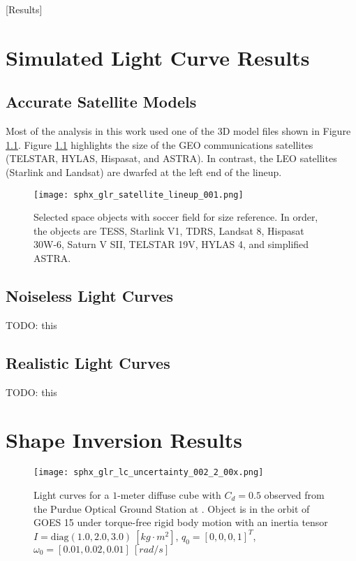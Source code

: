 [Results]
\graphicspath{{/Users/liamrobinson/Documents/PyLightCurves/docs/build/html/_images}}

\chapter{Simulated Light Curve Results}

\section{Accurate Satellite Models}

Most of the analysis in this work used one of the 3D model files shown in Figure \ref{fig:satellite_lineup}. Figure \ref{fig:satellite_lineup} highlights the size of the GEO communications satellites (TELSTAR, HYLAS, Hispasat, and ASTRA). In contrast, the LEO satellites (Starlink and Landsat) are dwarfed at the left end of the lineup.

\begin{figure}[ht]
    \centering
    \texttt{[image: sphx\_glr\_satellite\_lineup\_001.png]}
    \caption{Selected space objects with soccer field for size reference. In order, the objects are TESS, Starlink V1, TDRS, Landsat 8, Hispasat 30W-6, Saturn V SII, TELSTAR 19V, HYLAS 4, and simplified ASTRA.
    }
    \label{fig:satellite_lineup}
\end{figure}

\section{Noiseless Light Curves}

TODO: this

\section{Realistic Light Curves}

TODO: this

\chapter{Shape Inversion Results}

\begin{figure}[!htb]
  \centering
  \texttt{[image: sphx\_glr\_lc\_uncertainty\_002\_2\_00x.png]}
  \caption{Light curves for a $1$-meter diffuse cube with $C_d = 0.5$ observed from the Purdue Optical Ground Station at \pogslla. Object is in the orbit of GOES 15 under torque-free rigid body motion with an inertia tensor $I = \mathrm{diag}(1.0, 2.0, 3.0) \: \left[kg \cdot m^2\right]$, $q_0 = \left[0, 0, 0, 1\right]^T$, $\omega_0 = \left[ 0.01, 0.02, 0.01 \right] \: \left[rad/s\right]$}
  \label{fig:cube_lcs}
\end{figure}

